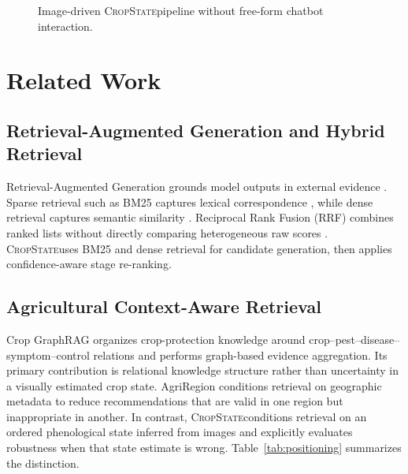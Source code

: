 \documentclass[conference]{IEEEtran}
\newcommand{\method}{\textsc{CropState}}
\begin{document}
\begin{figure}[!t]
\centering
{}
\caption{Image-driven \method pipeline without free-form chatbot interaction.}
\label{fig:pipeline}
\end{figure}

\section{Related Work}
\subsection{Retrieval-Augmented Generation and Hybrid Retrieval}
Retrieval-Augmented Generation grounds model outputs in external evidence \cite{lewis2020rag}. Sparse retrieval such as BM25 captures lexical correspondence \cite{robertson2009bm25}, while dense retrieval captures semantic similarity \cite{karpukhin2020dpr}. Reciprocal Rank Fusion (RRF) combines ranked lists without directly comparing heterogeneous raw scores \cite{cormack2009rrf}. \method uses BM25 and dense retrieval for candidate generation, then applies confidence-aware stage re-ranking.

\subsection{Agricultural Context-Aware Retrieval}
Crop GraphRAG organizes crop-protection knowledge around crop--pest--disease--symptom--control relations and performs graph-based evidence aggregation. Its primary contribution is relational knowledge structure rather than uncertainty in a visually estimated crop state. AgriRegion conditions retrieval on geographic metadata to reduce recommendations that are valid in one region but inappropriate in another. In contrast, \method conditions retrieval on an ordered phenological state inferred from images and explicitly evaluates robustness when that state estimate is wrong. Table~\ref{tab:positioning} summarizes the distinction.
\end{document}
